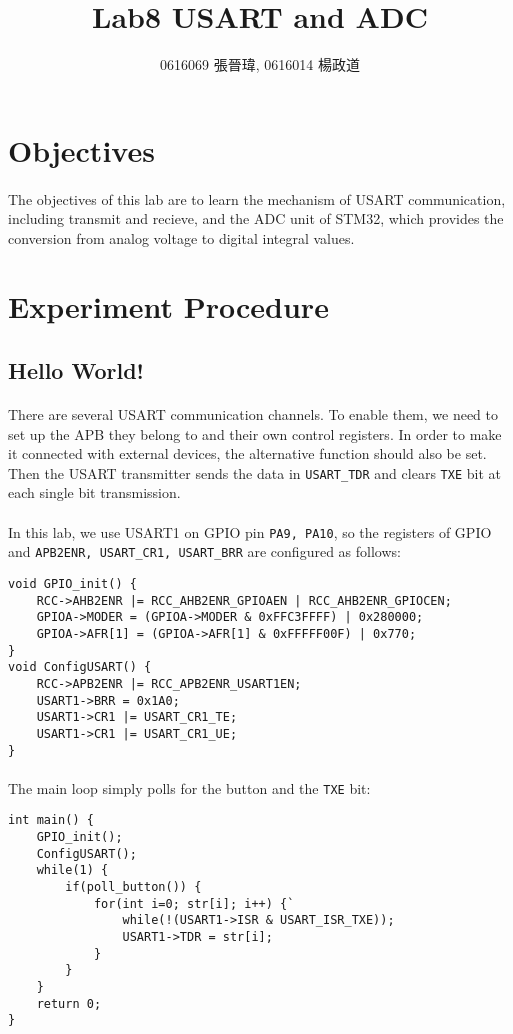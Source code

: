 \title{Lab8 USART and ADC}
\author{0616069 張晉瑋, 0616014 楊政道}
\maketitle
\thispagestyle{fancy}
\section{Objectives}
\paragraph{}
The objectives of this lab are to learn the mechanism of USART communication, including transmit and recieve,
and the ADC unit of STM32, which provides the conversion from analog voltage to digital integral values.
\section{Experiment Procedure}
\subsection{Hello World!}
\paragraph{}
There are several USART communication channels.
To enable them, we need to set up the APB they belong to and their own control registers.
In order to make it connected with external devices, the alternative function should also be set.
Then the USART transmitter sends the data in \texttt{USART\_TDR} and clears \texttt{TXE} bit at each single bit transmission.
\paragraph{}
In this lab, we use USART1 on GPIO pin \texttt{PA9, PA10},
so the registers of GPIO and \texttt{APB2ENR, USART\_CR1, USART\_BRR} are configured as follows:
\begin{lstlisting}
void GPIO_init() {
	RCC->AHB2ENR |= RCC_AHB2ENR_GPIOAEN | RCC_AHB2ENR_GPIOCEN;
	GPIOA->MODER = (GPIOA->MODER & 0xFFC3FFFF) | 0x280000;
	GPIOA->AFR[1] = (GPIOA->AFR[1] & 0xFFFFF00F) | 0x770;
}
void ConfigUSART() {
	RCC->APB2ENR |= RCC_APB2ENR_USART1EN;
	USART1->BRR = 0x1A0;
	USART1->CR1 |= USART_CR1_TE;
	USART1->CR1 |= USART_CR1_UE;
}
\end{lstlisting}
\paragraph{}
The main loop simply polls for the button and the \texttt{TXE} bit:
\begin{lstlisting}
int main() {
	GPIO_init();
	ConfigUSART();
	while(1) {
		if(poll_button()) {
			for(int i=0; str[i]; i++) {`
				while(!(USART1->ISR & USART_ISR_TXE));
				USART1->TDR = str[i];
			}
		}
	}
	return 0;
}
\end{lstlisting}
